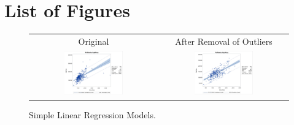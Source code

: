 \documentclass[11pt]{scrartcl} %
\begin{document}
\section{List of Figures}
\label{sec:Figures}
\begin{figure}[H] %
	\centering
	\begin{tabular}{p{} p{}}
	\hline
	\multicolumn{1}{|c|}{Original} & \multicolumn{1}{|c|}{After Removal of Outliers} \\
		\multicolumn{1}{|c|}{\includegraphics[width=0.48\textwidth]{../graphics/A1LR1}} &
		\multicolumn{1}{|c|}{\includegraphics[width=0.48\textwidth]{../graphics/A1LR2}}\\
		\hline
	\end{tabular}		
	\caption{Simple Linear Regression Models.}
	\label{fig:A1LR}
\end{figure}
\end{document}
